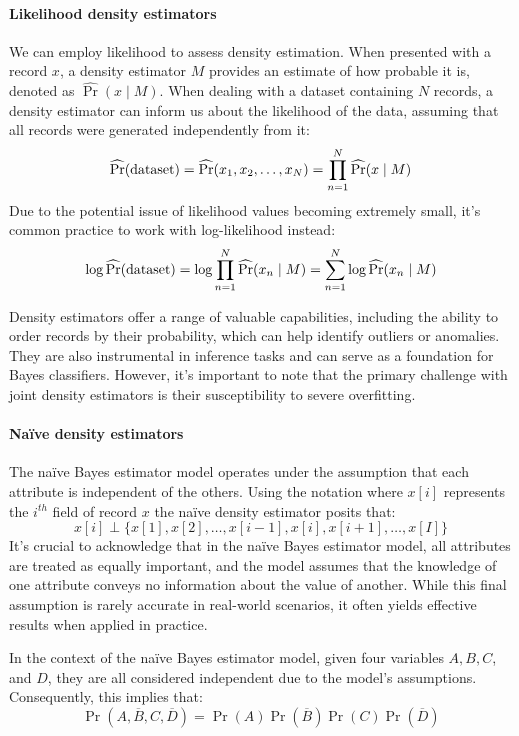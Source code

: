 \paragraph*{Likelihood density estimators}
We can employ likelihood to assess density estimation. 
When presented with a record $x$, a density estimator $M$ provides an estimate of how probable it is, denoted as $\widehat{\Pr}(x\mid M)$. 
When dealing with a dataset containing $N$ records, a density estimator can inform us about the likelihood of the data, assuming that all records were generated independently from it:
\[\widehat{\Pr}(\textnormal{dataset})=\widehat{\Pr}(x_1,x_2,\dots,x_N)=\prod_{n=1}^{N}\widehat{\Pr}(x\mid M)\]
Due to the potential issue of likelihood values becoming extremely small, it's common practice to work with log-likelihood instead:
\[\log{\widehat{\Pr}(\textnormal{dataset})}=\log{\prod_{n=1}^{N}{\widehat{\Pr}(x_n\mid M)}}=\sum_{n=1}^{N}{\log{\widehat{\Pr}(x_n\mid M)}}\]

Density estimators offer a range of valuable capabilities, including the ability to order records by their probability, which can help identify outliers or anomalies. 
They are also instrumental in inference tasks and can serve as a foundation for Bayes classifiers. 
However, it's important to note that the primary challenge with joint density estimators is their susceptibility to severe overfitting.

\paragraph*{Naïve density estimators}
The naïve Bayes estimator model operates under the assumption that each attribute is independent of the others. 
Using the notation where $x[i]$ represents the $i^{th}$ field of record $x$ the naïve density estimator posits that:
\[x[i] \perp \{x[1],x[2],\dots,x[i-1],x[i],x[i+1],\dots,x[I]\}\]
It's crucial to acknowledge that in the naïve Bayes estimator model, all attributes are treated as equally important, and the model assumes that the knowledge of one attribute conveys no information about the value of another. 
While this final assumption is rarely accurate in real-world scenarios, it often yields effective results when applied in practice.
\begin{example}
    In the context of the naïve Bayes estimator model, given four variables $A,B,C$, and $D$, they are all considered independent due to the model's assumptions. Consequently, this implies that:
    \[\Pr(A,\overline{B},C,\overline{D}) = \Pr(A)\Pr(\overline{B})\Pr(C)\Pr(\overline{D})\]
\end{example}

